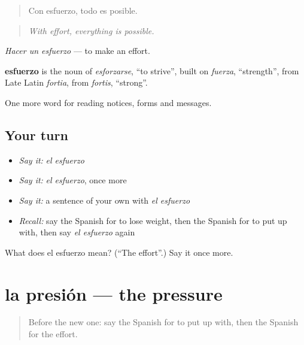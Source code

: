 \begin{quote}
Con esfuerzo, todo es posible.
\end{quote}

\begin{quote}
\emph{With effort, everything is possible.}
\end{quote}

\emph{Hacer un esfuerzo} — to make an effort.

\begin{cousinweb}
\textbf{esfuerzo} is the noun of \emph{esforzarse}, \textquotedblleft{}to strive\textquotedblright{}, built on \emph{fuerza}, \textquotedblleft{}strength\textquotedblright{}, from Late Latin \emph{fortia}, from \emph{fortis}, \textquotedblleft{}strong\textquotedblright{}.
\end{cousinweb}

\begin{grammarlens}[title={What you've built}]
One more word for reading notices, forms and messages.
\end{grammarlens}

\subsection*{Your turn}
\begin{itemize}
\raggedright
  \item \emph{Say it:} \emph{el esfuerzo}
  \item \emph{Say it:} \emph{el esfuerzo}, once more
  \item \emph{Say it:} a sentence of your own with \emph{el esfuerzo}
  \item \emph{Recall:} say the Spanish for to lose weight, then the Spanish for to put up with, then say \emph{el esfuerzo} again
\end{itemize}

\begin{tcolorbox}[breakable,colback=teal!4,colframe=teal!35!black,title={Before you move on}]
What does el esfuerzo mean? (\textquotedblleft{}The effort\textquotedblright{}.) Say it once more.
\end{tcolorbox}
\section[la presión]{la presión — the pressure}

\label{lesson:ES-C503-presion}



\begin{quote}
Before the new one: say the Spanish for to put up with, then the Spanish for the effort.
\end{quote}

